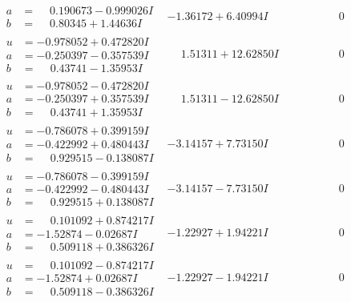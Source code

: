\documentclass[1p]{elsarticle_modified}
\theoremstyle{definition}
\begin{document}
$$\begin{array}{c|c|c}
\begin{aligned}
a &= \phantom{-}0.190673 - 0.999026 I \\
b &= \phantom{-}0.80345 + 1.44636 I\end{aligned}
 & -1.36172 + 6.40994 I & \phantom{-0.000000 } 0 \\ \hline\begin{aligned}
u &= -0.978052 + 0.472820 I \\
a &= -0.250397 - 0.357539 I \\
b &= \phantom{-}0.43741 - 1.35953 I\end{aligned}
 & \phantom{-}1.51311 + 12.62850 I & \phantom{-0.000000 } 0 \\ \hline\begin{aligned}
u &= -0.978052 - 0.472820 I \\
a &= -0.250397 + 0.357539 I \\
b &= \phantom{-}0.43741 + 1.35953 I\end{aligned}
 & \phantom{-}1.51311 - 12.62850 I & \phantom{-0.000000 } 0 \\ \hline\begin{aligned}
u &= -0.786078 + 0.399159 I \\
a &= -0.422992 + 0.480443 I \\
b &= \phantom{-}0.929515 - 0.138087 I\end{aligned}
 & -3.14157 + 7.73150 I & \phantom{-0.000000 } 0 \\ \hline\begin{aligned}
u &= -0.786078 - 0.399159 I \\
a &= -0.422992 - 0.480443 I \\
b &= \phantom{-}0.929515 + 0.138087 I\end{aligned}
 & -3.14157 - 7.73150 I & \phantom{-0.000000 } 0 \\ \hline\begin{aligned}
u &= \phantom{-}0.101092 + 0.874217 I \\
a &= -1.52874 - 0.02687 I \\
b &= \phantom{-}0.509118 + 0.386326 I\end{aligned}
 & -1.22927 + 1.94221 I & \phantom{-0.000000 } 0 \\ \hline\begin{aligned}
u &= \phantom{-}0.101092 - 0.874217 I \\
a &= -1.52874 + 0.02687 I \\
b &= \phantom{-}0.509118 - 0.386326 I\end{aligned}
 & -1.22927 - 1.94221 I & \phantom{-0.000000 } 0 \\ \hline\begin{aligned}

\end{aligned}
\end{array}$$
\end{document}
